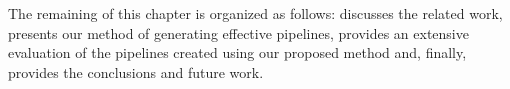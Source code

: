 The remaining of this chapter is organized as follows:
 discusses the related work,
 presents our method of generating effective pipelines,
 provides an extensive evaluation of the pipelines created using our proposed method and, finally,  provides the conclusions and future work.






